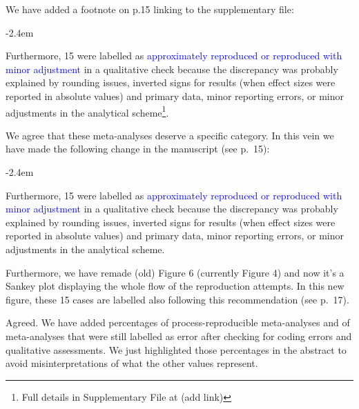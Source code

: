 \documentclass[draft]{article}
\renewenvironment{quote}{\begin{fquote}\advance\leftmargini -2.4em\begin{oldquote}}{\end{oldquote}\end{fquote}}
\newenvironment{fquote}
  {\def\FrameCommand{
	\fboxsep=0.6em %
	\fcolorbox{black}{white}}%
    \MakeFramed {\advance\hsize-2\width \FrameRestore}
    \begin{minipage}{\linewidth}
  }
  {\end{minipage}\endMakeFramed}
\begin{document}
We have added a footnote on p.15 linking to the supplementary file:

\begin{quote}
Furthermore, 15 were labelled as \textcolor{blue}{approximately reproduced or reproduced with minor adjustment} in a qualitative check because the discrepancy was probably explained by rounding issues, inverted signs for results (when effect sizes were reported in absolute values) and primary data, minor reporting errors, or minor adjustments in the analytical scheme\footnote{Full details in Supplementary File at (add link)}.
\end{quote}


We agree that these meta-analyses deserve a specific category. In this vein we have made the following change in the manuscript (see p.~15):

\begin{quote}
Furthermore, 15 were labelled as \textcolor{blue}{approximately reproduced or reproduced with minor adjustment} in a qualitative check because the discrepancy was probably explained by rounding issues, inverted signs for results (when effect sizes were reported in absolute values) and primary data, minor reporting errors, or minor adjustments in the analytical scheme.
\end{quote}

Furthermore, we have remade (old) Figure 6 (currently Figure 4) and now it's a Sankey plot displaying the whole flow of the reproduction attempts. In this new figure, these 15 cases are labelled also following this recommendation (see p.~17).


Agreed. We have added percentages of process-reproducible meta-analyses and of meta-analyses that were still labelled as error after checking for coding errors and qualitative assessments. We just highlighted those percentages in the abstract to avoid misinterpretations of what the other values represent.
\end{document}
